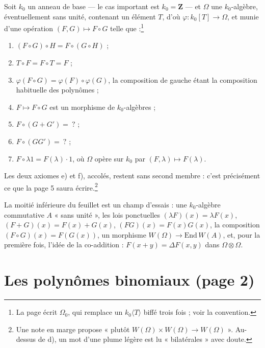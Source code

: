 \documentclass[11pt,a4paper]{article}
\begin{document}
Soit $k_{0}$ un anneau de base --- le cas important est $k_{0} = \mathbf{Z}$ ---
et $\Omega$ une $k_{0}$-algèbre, éventuellement sans unité, contenant un élément
$T$, d'où $\varphi : k_{0}[T] \to \Omega$, et munie d'une opération
$(F, G) \mapsto F \circ G$ telle que :\footnote{La page écrit $\Omega_{0}$, qui
remplace un $k_{0}\langle T \rangle$ biffé trois fois ; voir la convention.}
\begin{enumerate}
\item[a)] $(F \circ G) \circ H = F \circ (G \circ H)$ ;
\item[b)] $T \circ F = F \circ T = F$ ;
\item[c)] $\varphi(F \circ G) = \varphi(F) \circ \varphi(G)$, la composition de
gauche étant la composition habituelle des polynômes ;
\item[d)] $F \mapsto F \circ G$ est un morphisme de $k_{0}$-algèbres ;
\item[e)] $F \circ (G + G') = \ ?$ ;
\item[f)] $F \circ (GG') = \ ?$ ;
\item[g)] $F \circ \lambda 1 = F(\lambda) \cdot 1$, où $\Omega$ opère sur $k_{0}$
par $(F, \lambda) \mapsto F(\lambda)$.
\end{enumerate}
Les deux axiomes e) et f), accolés, restent sans second membre : c'est
précisément ce que la page 5 saura écrire.\footnote{Une note en marge propose
« plutôt $W(\Omega) \times W(\Omega) \to W(\Omega)$ ». Au-dessus de d), un mot
d'une plume légère est lu « bilatérales » avec doute.}

La moitié inférieure du feuillet est un champ d'essais : une $k_{0}$-algèbre
commutative $A$ « sans unité », les lois ponctuelles
$(\lambda F)(x) = \lambda F(x)$, $(F + G)(x) = F(x) + G(x)$, $(FG)(x) =
F(x)G(x)$, la composition $(F \circ G)(x) = F(G(x))$, un morphisme
$W(\Omega) \to \mathrm{End}\, W(A)$, et, pour la première fois, l'idée de la
co-addition : $F(x + y) = \Delta F(x, y)$ dans $\Omega \otimes \Omega$.

\section*{Les polynômes binomiaux (page 2)}
\end{document}
